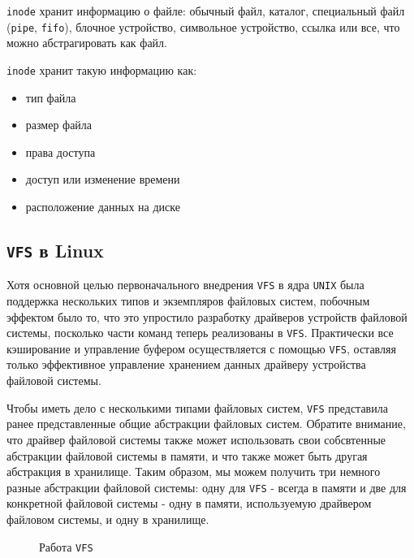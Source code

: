 \documentclass{article}
\begin{document}
    \texttt{inode} хранит информацию о файле: обычный файл, каталог, специальный
    файл (\texttt{pipe}, \texttt{fifo}), блочное устройство, символьное 
    устройство, ссылка или все, что можно абстрагировать как файл.

    \texttt{inode} хранит такую информацию как:

    \begin{itemize}
        \item тип файла
        \item размер файла
        \item права доступа
        \item доступ или изменение времени
        \item расположение данных на диске
    \end{itemize}

    \subsection{\texttt{VFS} в Linux}
    Хотя основной целью первоначального внедрения \texttt{VFS} в ядра 
    \texttt{UNIX} была поддержка нескольких типов и экземпляров файловых
    систем, побочным эффектом было то, что это упростило разработку
    драйверов устройств файловой системы, посколько части команд теперь
    реализованы в \texttt{VFS}. Практически все кэширование и управление
    буфером осуществляется с помощью \texttt{VFS}, оставляя только
    эффективное управление хранением данных драйверу устройства файловой
    системы.

    Чтобы иметь дело с несколькими типами файловых систем, \texttt{VFS}
    представила ранее представленные общие абстракции файловых систем. Обратите
    внимание, что драйвер файловой системы также может использовать свои
    собсвтенные абстракции файловой системы в памяти, и что также может быть
    другая абстракция в хранилище. Таким образом, мы можем получить три немного
    разные абстракции файловой системы: одну для \texttt{VFS} - всегда в памяти
    и две для конкретной файловой системы - одну в памяти, используемую драйвером
    файловом системы, и одну в хранилище.

    \newpage

    \begin{figure}[h!]
        \caption{Работа \texttt{VFS}}
    \end{figure}
\end{document}
